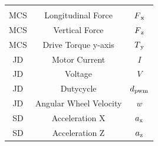 \begin{center}
\label{table:features1}
\begin{supertabular}{ccc}
        \quad  & \quad               & \quad \\[-5pt]
        MCS & Longitudinal Force     &  $F\textsubscript{x}$  \\
        MCS & Vertical Force         & $F\textsubscript{z}$   \\ 
        MCS & Drive Torque y-axis    & $T\textsubscript{y}$   \\ 
        JD  & Motor Current          & $I$                    \\ 
        JD  & Voltage                & $V$                    \\ 
        JD  & Dutycycle              & $d\textsubscript{pwm}$ \\ 
        JD  & Angular Wheel Velocity & $w$                    \\
        SD  & Acceleration X         & $a\textsubscript{x}$   \\ 
        SD  & Acceleration Z         & $a\textsubscript{z}$   \\ 
\end{supertabular}
\end{center}

